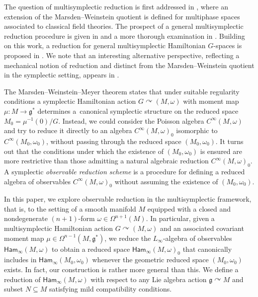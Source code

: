 \documentclass[10pt,a4paper]{amsart}
\numberwithin{equation}{section}
\newcommand{\g}{\mathfrak{g}}
\newcommand{\Ham}{\mathsf{Ham}}
\renewcommand{\subset}{\subseteq}
\begin{document}
The question of multisymplectic reduction is first addressed in \cite{Sniatycki04}, where an extension of the Marsden--Weinstein quotient is defined for multiphase spaces associated to classical field theories. The prospect of a general multisymplectic reduction procedure is given in \cite{MarsdenWeinstein01,OrtegaRatiu04} and a more thorough examination in \cite{Echeverria-Enriquez18}. Building on this work, a reduction for general multisymplectic Hamiltonian $G$-spaces is proposed in \cite{Blacker21}. We note that an interesting alternative perspective, reflecting a mechanical notion of reduction and distinct from the Marsden--Weinstein quotient in the symplectic setting, appears in \cite[Definition 4.2]{deLucasGraciaRivasRoman-RoyVilarino22}.


The Marsden--Weinstein--Meyer theorem \cite{MarsdenWeinstein74,Meyer73} states that under suitable regularity conditions a symplectic Hamiltonian action $G\curvearrowright(M,\omega)$ with moment map $\mu\colon M\to\g^*$ determines a~canonical symplectic structure on the reduced space $M_0=\mu^{-1}(0)/G$. Instead, we could consider the Poisson algebra $C^\infty(M,\omega)$ and try to reduce it directly to an algebra $C^\infty(M,\omega)_0$ isomorphic to $C^\infty(M_0,\omega_0)$, without passing through the reduced space $(M_0,\omega_0)$. It turns out that the conditions under which the existence of $(M_0,\omega_0)$ is ensured are more restrictive than those admitting a natural algebraic reduction  $C^\infty(M,\omega)_0$. A symplectic \emph{observable reduction scheme} is a procedure for defining a reduced algebra of observables $C^\infty(M,\omega)_0$ without assuming the existence of $(M_0,\omega_0)$.

In this paper, we explore observable reduction in the multisymplectic framework, that is, to the setting of a smooth manifold $M$ equipped with a closed and nondegenerate $(n+1)$-form $\omega\in\Omega^{n+1}(M)$. In particular, given a multisymplectic Hamiltonian action $G\curvearrowright(M,\omega)$ and an associated covariant moment map $\mu\in\Omega^{n-1}(M,\g^*)$, we reduce the $L_\infty$-algebra of observables $\Ham_\infty(M,\omega)$ to obtain a reduced space $\Ham_\infty(M,\omega)_0$ that canonically includes in $\Ham_\infty(M_0,\omega_0)$ whenever the geometric reduced space $(M_0,\omega_0)$ exists. In fact, our construction is rather more general than this. We define a reduction of $\Ham_\infty(M,\omega)$ with respect to any Lie algebra action $\g\curvearrowright M$ and subset $N\subset M$ satisfying mild compatibility conditions.
\end{document}
